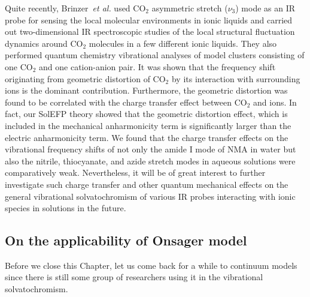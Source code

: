 \documentclass[a4paper,titlepage,twoside,fleqn,12pt]{book}
\begin{document}
\begin{refsection}
Quite recently, 
Brinzer~\emph{et al.}
used CO$_2$ asymmetric
stretch ($\nu_3$) mode as an IR probe for sensing the local molecular
environments in ionic liquids and carried out two\hyp{}dimensional
IR spectroscopic studies of the local structural fluctuation dynamics
around CO$_2$ molecules in a few different ionic 
liquids. \citep{Brinzer.Berquist.Zhe.Dutta.Johnson.Krisher.Lambrecht.Garrett-Roe.JCP.2015} 
They also performed quantum chemistry vibrational analyses
of model clusters consisting of one CO$_2$ and one cation-anion
pair. It was shown that the frequency shift originating from
geometric distortion of CO$_2$ by its interaction with surrounding
ions is the dominant contribution. Furthermore, the geometric
distortion was found to be correlated with the charge transfer
effect between CO$_2$ and ions. In fact, our SolEFP theory
showed that the geometric distortion effect, which is included
in the mechanical anharmonicity term
is significantly larger than the electric anharmonicity term.
We found that the charge transfer effects on the vibrational
frequency shifts of not only the amide I mode of NMA
in water \citep{Blasiak.Cho.JCP.2014} but also the nitrile, thiocyanate, and
azide stretch modes in aqueous solutions \citep{Lee.Choi.Cho.PCCP.2010} 
were comparatively
weak. Nevertheless, it will be of great interest to further
investigate such charge transfer and other quantum mechanical
effects on the general vibrational solvatochromism of various
IR probes interacting with ionic species in solutions in the
future.

\subsection{On the applicability of Onsager model}

Before we close this Chapter, let us come back for a while to
continuum models since there is still some group of researchers
using it in the vibrational solvatochromism. 


\end{refsection}
\end{document}
